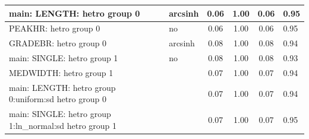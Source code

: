 \begin{table}
\begin{center}
\begin{tabular}{|l|l|c|c|c|l|}
			\hline
			main: LENGTH: hetro group 0 & arcsinh & 0.06 & 1.00 & 0.06 & 0.95 \\
			\hline
			PEAKHR: hetro group 0 & no & 0.06 & 1.00 & 0.06 & 0.95 \\
			\hline
			GRADEBR: hetro group 0 & arcsinh & 0.08 & 1.00 & 0.08 & 0.94 \\
			\hline
			main: SINGLE: hetro group 1 & no & 0.08 & 1.00 & 0.08 & 0.93 \\
			\hline
			MEDWIDTH: hetro group 1 &  & 0.07 & 1.00 & 0.07 & 0.94 \\
			\hline
			main: LENGTH: hetro group 0:uniform:sd  hetro group 0 &  & 0.07 & 1.00 & 0.07 & 0.94 \\
			\hline
			main: SINGLE: hetro group 1:ln_normal:sd  hetro group 1 &  & 0.07 & 1.00 & 0.07 & 0.95 \\
			\hline
		\end{tabular}
	\end{center}
\end{table}
